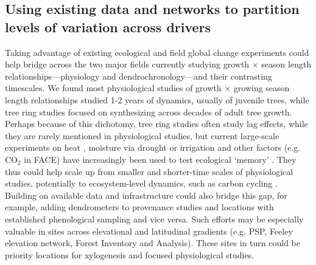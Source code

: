 \documentclass[11pt]{article}
\begin{document}
\subsection*{Using existing data and networks to partition levels of variation across drivers}

Taking advantage of existing ecological and field global change experiments could help bridge across the two major fields currently studying growth $\times$ season length relationships---physiology and dendrochronology---and their contrasting timescales. We found most physiological studies of growth $\times$ growing season length relationships studied 1-2 years of dynamics, usually of juvenile trees, while tree ring studies focused on synthesizing across decades of adult tree growth. Perhaps because of this dichotomy, tree ring studies often study lag effects, while they are rarely mentioned in physiological studies, but current large-scale experiments on heat \citep[e.g. SPRUCE,][]{hanson2017attaining}, moisture via drought or irrigation \citep[e.g. DroughtNet, Pfynwald][]{smith2016drought} and other factors (e.g. $\text{CO}_2$ in FACE) have increasingly been used to test ecological `memory' \citep[e.g. ][]{flinker2021promise, schweiger2022transgenerational}. They thus could help scale up from smaller and shorter-time scales of physiological studies, potentially to ecosystem-level dynamics, such as carbon cycling \citep{ding2021plant,jensen2019simulated}. Building on available data and infrastructure could also bridge this gap, for example, adding dendrometers to provenance studies \citep[or other ways to measure growth, e.g.,][]{montwe2016drought} and locations with established phenological sampling and vice versa. Such efforts may be especially valuable in sites across elevational and latitudinal gradients (e.g. PSP, Feeley elevation network, Forest Inventory and Analysis). These sites in turn could be priority locations for xylogenesis and focused physiological studies. 
\end{document}
